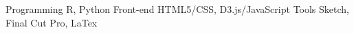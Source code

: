 

\begin{cvskills}
  \cvskill
    {Programming} %
    {R, Python} %
  \cvskill
    {Front-end} %
    {HTML5/CSS, D3.js/JavaScript} %
  \cvskill
    {Tools} %
    {Sketch, Final Cut Pro, LaTex} %
\end{cvskills}
